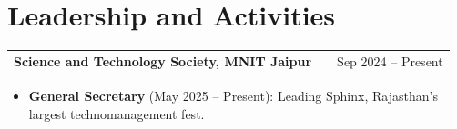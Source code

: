 \documentclass[a4paper,10pt]{article}
\begin{document}
\section{Leadership and Activities}
\begin{tabularx}{\linewidth}{ @{}l X r@{} }
\textbf{Science and Technology Society, MNIT Jaipur} & & \textcolor[HTML]{371e77}{Sep 2024 -- Present} \\
\end{tabularx}
\vspace{-8pt}
\begin{itemize}[nosep, leftmargin=1.5em, itemsep=0pt, topsep=0pt]
\item \textbf{General Secretary} \textcolor[HTML]{371e77}{(May 2025 -- Present):} Leading Sphinx, Rajasthan's largest technomanagement fest.
\end{itemize}
\end{document}
